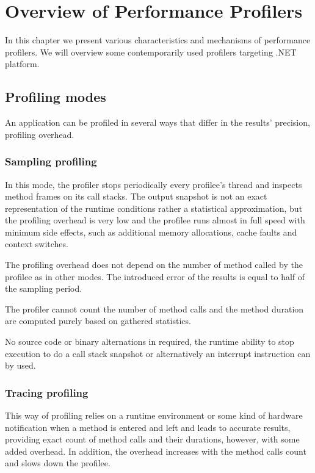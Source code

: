 \chapter{Overview of Performance Profilers }

In this chapter we present various characteristics and mechanisms of performance profilers. We will overview some contemporarily used profilers targeting .NET platform.


\section{Profiling modes}
An application can be profiled in several ways that differ in the results' precision, profiling overhead. 

\subsection{Sampling profiling}
In this mode, the profiler stops periodically every profilee's thread and inspects method frames on its call stacks. The output snapshot is not an exact representation of the runtime conditions rather a statistical approximation, but the profiling overhead is very low and the profilee runs almost in full speed with minimum side effects, such as additional memory allocations, cache faults and context switches.

The profiling overhead does not depend on the number of method called by the profilee as in other modes. The introduced error of the results is equal to half of the sampling period.

The profiler cannot count the number of method calls and the method duration are computed purely based on gathered statistics. 

No source code or binary alternations in required, the runtime ability to stop execution to do a call stack snapshot or alternatively an interrupt instruction can by used.

\subsection{Tracing profiling}
This way of profiling relies on a runtime environment or some kind of hardware notification when a method is entered and left and leads to accurate results, providing exact count of method calls and their durations, however, with some added overhead. In addition, the overhead increases with the method calls count and slows down the profilee.

